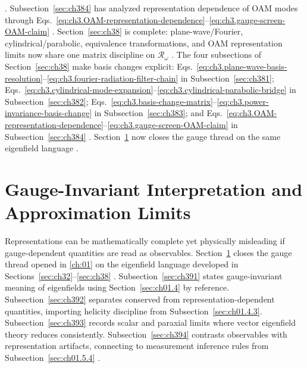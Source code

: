 \cite{harrington2001}.
Subsection~\ref{sec:ch384} has analyzed representation dependence of OAM modes through
Eqs.~\eqref{eq:ch3.OAM-representation-dependence}--\eqref{eq:ch3.gauge-screen-OAM-claim}
\cite{allen1992}. Section~\ref{sec:ch38} is complete: plane-wave/Fourier, cylindrical/parabolic, equivalence
transformations, and OAM representation limits now share one matrix discipline on \(\mathcal{R}_\omega\) \cite{hansen1988}.
The four subsections of Section~\ref{sec:ch38} make basis changes explicit:
Eqs.~\eqref{eq:ch3.plane-wave-basis-resolution}--\eqref{eq:ch3.fourier-radiation-filter-chain} in Subsection~\ref{sec:ch381};
Eqs.~\eqref{eq:ch3.cylindrical-mode-expansion}--\eqref{eq:ch3.cylindrical-parabolic-bridge} in Subsection~\ref{sec:ch382};
Eqs.~\eqref{eq:ch3.basis-change-matrix}--\eqref{eq:ch3.power-invariance-basis-change} in Subsection~\ref{sec:ch383}; and
Eqs.~\eqref{eq:ch3.OAM-representation-dependence}--\eqref{eq:ch3.gauge-screen-OAM-claim} in Subsection~\ref{sec:ch384}
\cite{stratton1941}. Section~\ref{sec:ch39} now closes the gauge thread on the same
eigenfield language \cite{belinfante1940}.
\section{Gauge-Invariant Interpretation and Approximation Limits}
\label{sec:ch39}
Representations can be mathematically complete yet physically misleading if gauge-dependent quantities are
read as observables. Section~\ref{sec:ch39} closes the gauge thread opened in \ref{ch:01} on the
eigenfield language developed in Sections~\ref{sec:ch32}--\ref{sec:ch38} \cite{belinfante1940}.
Subsection~\ref{sec:ch391} states gauge-invariant meaning of eigenfields using Section~\ref{sec:ch01.4} by
reference. Subsection~\ref{sec:ch392} separates conserved from representation-dependent quantities, importing
helicity discipline from Subsection~\ref{sec:ch01.4.3}. Subsection~\ref{sec:ch393} records scalar and paraxial
limits where vector eigenfield theory reduces consistently. Subsection~\ref{sec:ch394} contrasts observables
with representation artifacts, connecting to measurement inference rules from
Subsection~\ref{sec:ch01.5.4} \cite{harrington2001}.
